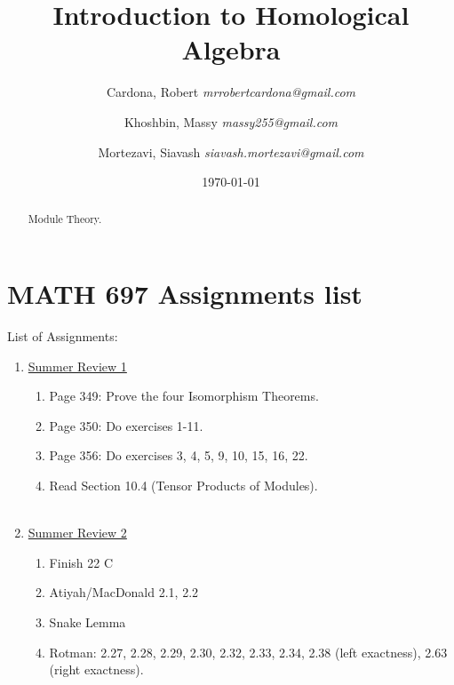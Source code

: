 \documentclass[8pt]{amsart}
\theoremstyle{plain}%
\theoremstyle{definition}
\theoremstyle{remark}
\numberwithin{equation}{section}
\begin{document}
\title[MATH 697]{Introduction to Homological Algebra}


\author{
	Cardona, Robert \textit{mrrobertcardona@gmail.com}
	\and
	Khoshbin, Massy \textit{massy255@gmail.com}
	\and
	Mortezavi, Siavash \textit{siavash.mortezavi@gmail.com}
}


\address{Department of Mathematics \\ California State University Long Beach}

\date{\today}

\begin{abstract}
Module Theory.
\end{abstract}

\maketitle

\setcounter{section}{0}
\section{MATH 697 Assignments list}

List of Assignments:\\
\begin{enumerate}
\item \underline{Summer Review 1}\\
		\begin{enumerate}
		\item Page 349: Prove the four Isomorphism Theorems.
		\item Page 350: Do exercises 1-11.
		\item Page 356: Do exercises 3, 4, 5, 9, 10, 15, 16, 22.
		\item Read Section 10.4 (Tensor Products of Modules).\\
		\\
		\end{enumerate}
\item \underline{Summer Review 2}\\
		\begin{enumerate}
		\item Finish 22 C
		\item Atiyah/MacDonald 2.1, 2.2
		\item Snake Lemma
		\item Rotman: 2.27, 2.28, 2.29, 2.30, 2.32, 2.33, 2.34, 2.38 (left exactness), 2.63 (right exactness).
		\end{enumerate}				
\end{enumerate}
\end{document}
